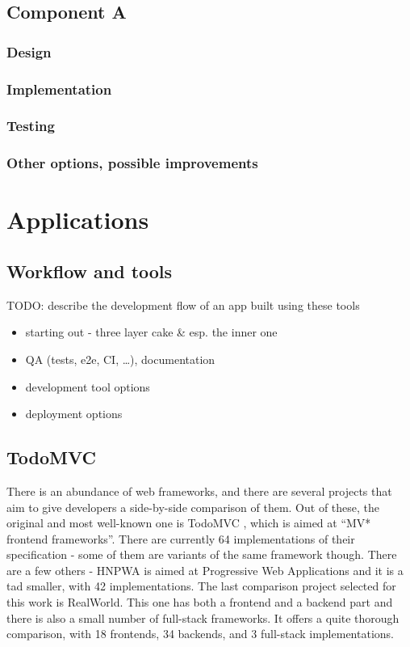 \documentclass[english,odsaz]{fitthesis}
\begin{document}
\section{Component A}
\label{sec:orgc62d9c1}
\subsection{Design}
\label{sec:org91b64af}
\subsection{Implementation}
\label{sec:orgf2038b8}
\subsection{Testing}
\label{sec:org808311a}
\subsection{Other options, possible improvements}
\label{sec:org115cc84}

\chapter{Applications}
\label{sec:orge8a56b4}
\section{Workflow and tools}
\label{sec:org10cd01d}
TODO: describe the development flow of an app built using these tools

\begin{itemize}
\item starting out - three layer cake \& esp. the inner one
\item QA (tests, e2e, CI, \ldots{}), documentation
\item development tool options
\item deployment options
\end{itemize}

\section{TodoMVC}
\label{sec:org16f12be}
There is an abundance of web frameworks, and there are several projects that aim
to give developers a side-by-side comparison of them. Out of these, the original
and most well-known one is TodoMVC \cite{todomvc}, which is aimed at ``MV* frontend
frameworks''. There are currently 64 implementations of their specification -
some of them are variants of the same framework though. There are a few others -
HNPWA is aimed at Progressive Web Applications and it is a tad smaller, with 42
implementations. The last comparison project selected for this work is
RealWorld. This one has both a frontend and a backend part and there is also a
small number of full-stack frameworks. It offers a quite thorough comparison,
with 18 frontends, 34 backends, and 3 full-stack implementations.
\end{document}
